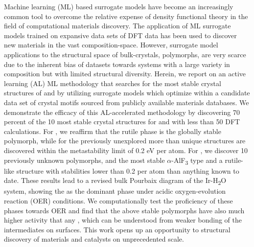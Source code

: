 %



%
Machine learning (ML) based surrogate models have become an increasingly common tool to overcome the relative expense of density functional theory in the field of computational materials discovery.
%
The application of ML surrogate models trained on expansive data sets of  DFT data has been used to discover new materials in the vast composition-space.
%
However, surrogate model applications to the structural space of bulk-crystals,  polymorphs,
are very scarce due to the inherent bias of  datasets towards systems with a large variety in composition but with limited structural diversity. 
%
Herein, we report on an active learning (AL) ML methodology that searches for the most stable crystal structures of \IrOtwo and \IrOthree by utilizing surrogate models which optimize within a candidate data set of crystal motifs sourced from publicly available materials databases.
We demonstrate the efficacy of this AL-accelerated methodology by discovering 70 percent of the 10 most stable crystal structures for \IrOtwo and \IrOthree with less than 50 DFT calculations.
%
For \IrOtwo, we reaffirm that the rutile phase is the globally stable polymorph,
while for the previously unexplored \IrOthree more than unique structures are discovered within the metastability limit of 0.2 eV per atom.
%
For \IrOthree, we discover 10 previously unknown polymorphs, and the most stable 
$\alpha$-AlF\textsubscript{3} type and a rutile-like \IrOthree structure with stabilities lower than 0.2 per atom than anything known to date. 
%
These results lead to a revised bulk Pourbaix diagram of the Ir-H\textsubscript{2}O system, showing the \IrOthree as the dominant phase under acidic oxygen-evolution reaction (OER) conditions.
%
We computationally test the proficiency of these phases towards OER and find that the above stable \IrOthree polymorphs have also much higher activity that any \IrOtwo, which can be understood from weaker bonding of the intermediates on \IrOthree surfaces.   
%
This work opens up an opportunity to structural discovery of materials and catalysts on unprecedented scale.
